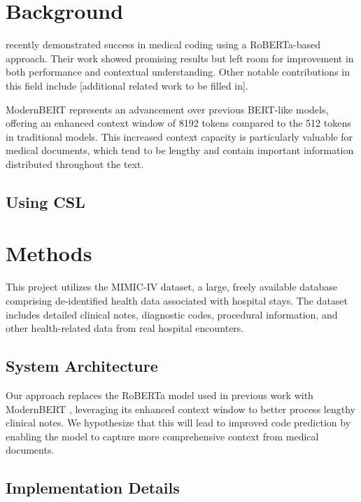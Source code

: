 \documentclass[
  authoryear,
  preprint]{elsarticle}
\begin{document}
\section{Background}\label{background}

\citet{edin2024explainable} recently demonstrated success in medical
coding using a RoBERTa-based approach. Their work showed promising
results but left room for improvement in both performance and contextual
understanding. Other notable contributions in this field include
{[}additional related work to be filled in{]}.

ModernBERT \citep{warner2024modernbert} represents an advancement over
previous BERT-like models, offering an enhanced context window of 8192
tokens compared to the 512 tokens in traditional models. This increased
context capacity is particularly valuable for medical documents, which
tend to be lengthy and contain important information distributed
throughout the text.

\subsection{Using CSL}\label{using-csl}

\section{Methods}\label{methods}

This project utilizes the MIMIC-IV dataset, a large, freely available
database comprising de-identified health data associated with hospital
stays. The dataset includes detailed clinical notes, diagnostic codes,
procedural information, and other health-related data from real hospital
encounters.

\subsection{System Architecture}\label{system-architecture}

Our approach replaces the RoBERTa model used in previous work
\citep{edin2024explainable} with ModernBERT
\citep{warner2024modernbert}, leveraging its enhanced context window to
better process lengthy clinical notes. We hypothesize that this will
lead to improved code prediction by enabling the model to capture more
comprehensive context from medical documents.

\subsection{Implementation Details}\label{implementation-details}
\end{document}
